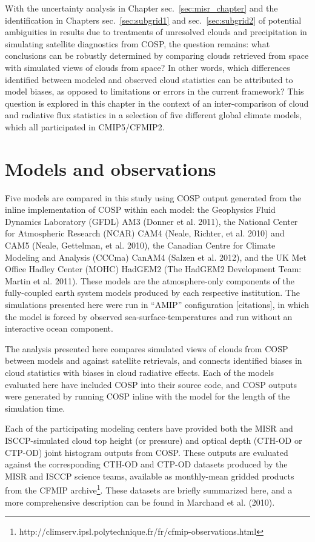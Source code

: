 With the uncertainty analysis in Chapter sec.~\ref{sec:misr_chapter} and
the identification in Chapters sec.~\ref{sec:subgrid1} and
sec.~\ref{sec:subgrid2} of potential ambiguities in results due to
treatments of unresolved clouds and precipitation in simulating
satellite diagnostics from COSP, the question remains: what conclusions
can be robustly determined by comparing clouds retrieved from space with
simulated views of clouds from space? In other words, which differences
identified between modeled and observed cloud statistics can be
attributed to model biases, as opposed to limitations or errors in the
current framework? This question is explored in this chapter in the
context of an inter-comparison of cloud and radiative flux statistics in
a selection of five different global climate models, which all
participated in CMIP5/CFMIP2.

\section{Models and observations}\label{models-and-observations}

Five models are compared in this study using COSP output generated from
the inline implementation of COSP within each model: the Geophysics
Fluid Dynamics Laboratory (GFDL) AM3 (Donner et al. 2011), the National
Center for Atmospheric Research (NCAR) CAM4 (Neale, Richter, et al.
2010) and CAM5 (Neale, Gettelman, et al. 2010), the Canadian Centre for
Climate Modeling and Analysis (CCCma) CanAM4 (Salzen et al. 2012), and
the UK Met Office Hadley Center (MOHC) HadGEM2 (The HadGEM2 Development
Team: Martin et al. 2011). These models are the atmosphere-only
components of the fully-coupled earth system models produced by each
respective institution. The simulations presented here were run in
``AMIP'' configuration {[}citations{]}, in which the model is forced by
observed sea-surface-temperatures and run without an interactive ocean
component.

The analysis presented here compares simulated views of clouds from COSP
between models and against satellite retrievals, and connects identified
biases in cloud statistics with biases in cloud radiative effects. Each
of the models evaluated here have included COSP into their source code,
and COSP outputs were generated by running COSP inline with the model
for the length of the simulation time.

Each of the participating modeling centers have provided both the MISR
and ISCCP-simulated cloud top height (or pressure) and optical depth
(CTH-OD or CTP-OD) joint histogram outputs from COSP. These outputs are
evaluated against the corresponding CTH-OD and CTP-OD datasets produced
by the MISR and ISCCP science teams, available as monthly-mean gridded
products from the CFMIP archive\footnote{http://climserv.ipsl.polytechnique.fr/fr/cfmip-observations.html}.
These datasets are briefly summarized here, and a more comprehensive
description can be found in Marchand et al. (2010).

